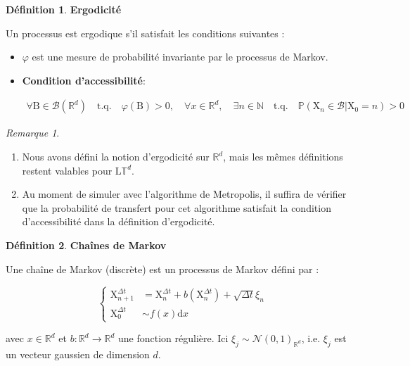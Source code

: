 \documentclass[11pt]{article}
\theoremstyle{definition}
\newtheorem{definition}{Définition}[section]
\theoremstyle{remark}
\newtheorem*{remark}{Remarque}
\begin{document}
\begin{definition}{\textbf{Ergodicité}}

Un processus est ergodique s'il satisfait les conditions suivantes :

\begin{itemize}

\item 

$\varphi$ est une mesure de probabilité invariante par le processus de Markov. 

\item 

\textbf{Condition d'accessibilité}: 

\begin{align}
\forall \mathrm{B} \in \mathcal{B}(\mathbb{R}^d)\quad \mathrm{t.q.}\quad \varphi(\mathrm{B})>0, \quad \forall x\in\mathbb{R}^d, \quad \exists n\in\mathbb{N} \quad \mathrm{t.q.}\quad \mathbb{P}(\mathrm{X}_n \in \mathcal{B} | \mathrm{X}_0 =n ) > 0 
\end{align}
\end{itemize}

\end{definition}

\begin{remark}
\begin{enumerate}
\item 
Nous avons défini la notion d'ergodicité sur $\mathbb{R}^d$, mais les mêmes définitions restent valables pour $\mathrm{L}\mathbb{T}^d$.
\item 
Au moment de simuler avec l'algorithme de Metropolis, il suffira de vérifier que la probabilité de transfert pour cet algorithme satisfait la condition d'accessibilité dans la définition d'ergodicité.

\end{enumerate}
\end{remark}


\begin{definition}{\textbf{Chaînes de Markov}}

Une chaîne de Markov (discrète) est un processus de Markov défini par :

\begin{equation}
\left\{ 
  \begin{array}{ll}
  \mathrm{X}_{n+1}^{\Delta t} &= \mathrm{X}_{n}^{\Delta t} + b(\mathrm{X}_{n}^{\Delta t}) + \sqrt{\Delta t} \xi_{n}
  \\
  \mathrm{X}_{0}^{\Delta t} &\sim  f(x) \mathrm{d}x 
  \end{array}
\right.
\end{equation}



avec $x \in \mathbb{R}^d$ et $b: \mathbb{R}^d \to \mathbb{R}^d$ une fonction régulière. Ici $\xi_{j} \sim \mathcal{N}(0,1)_{\mathbb{R}^d}$, i.e. $\xi_{j}$ est un vecteur gaussien de dimension $d$. 
\end{definition}
\end{document}
